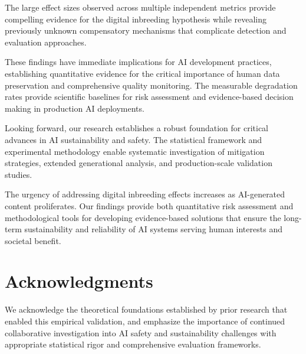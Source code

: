 \documentclass[11pt]{article}
\begin{document}
The large effect sizes observed across multiple independent metrics provide compelling evidence for the digital inbreeding hypothesis while revealing previously unknown compensatory mechanisms that complicate detection and evaluation approaches.

These findings have immediate implications for AI development practices, establishing quantitative evidence for the critical importance of human data preservation and comprehensive quality monitoring. The measurable degradation rates provide scientific baselines for risk assessment and evidence-based decision making in production AI deployments.

Looking forward, our research establishes a robust foundation for critical advances in AI sustainability and safety. The statistical framework and experimental methodology enable systematic investigation of mitigation strategies, extended generational analysis, and production-scale validation studies.

The urgency of addressing digital inbreeding effects increases as AI-generated content proliferates. Our findings provide both quantitative risk assessment and methodological tools for developing evidence-based solutions that ensure the long-term sustainability and reliability of AI systems serving human interests and societal benefit.

\section*{Acknowledgments}

We acknowledge the theoretical foundations established by prior research that enabled this empirical validation, and emphasize the importance of continued collaborative investigation into AI safety and sustainability challenges with appropriate statistical rigor and comprehensive evaluation frameworks.



\end{document}
